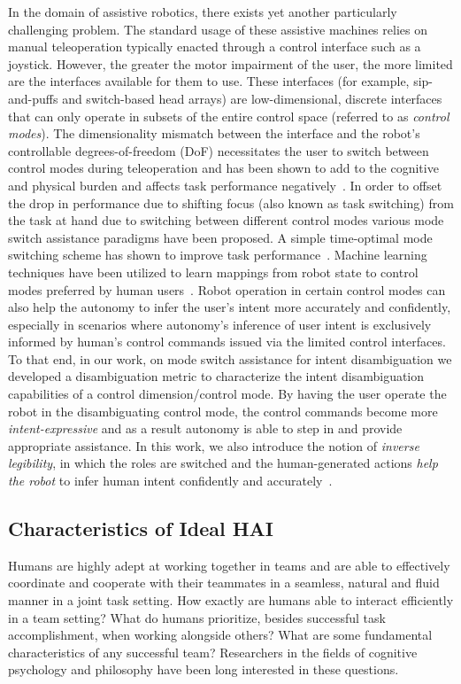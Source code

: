 \documentclass[12pt]{article}
\begin{document}
In the domain of assistive robotics, there exists yet another particularly challenging problem. The standard usage of these assistive machines relies on manual teleoperation typically enacted through a control interface such as a joystick. However, the greater the motor impairment of the user, the more limited are the interfaces available for them to use. These interfaces (for example, sip-and-puffs and switch-based head arrays) are low-dimensional, discrete interfaces that can only operate in subsets of the entire control space (referred to as \textit{control modes}). The dimensionality mismatch between the interface and the robot's controllable degrees-of-freedom (DoF) necessitates the user to switch between control modes during teleoperation and has been shown to add to the cognitive and physical burden and affects task performance negatively~\cite{pilarski2012dynamic}.
In order to offset the drop in performance due to shifting focus (also known as task switching) from the task at hand due to switching between different control modes various mode switch assistance paradigms have been proposed. A simple time-optimal mode switching scheme has shown to improve task performance~\cite{herlant2016assistive}. Machine learning techniques have been utilized to learn mappings from robot state to control modes preferred by human users~\cite{jainrobot}. Robot operation in certain control modes can also help the autonomy to infer the user's intent more accurately and confidently, especially in scenarios where autonomy's inference of user intent is exclusively informed by human's control commands issued via the limited control interfaces. To that end, in our work, on mode switch assistance for intent disambiguation we developed a disambiguation metric to characterize the intent disambiguation capabilities of a control dimension/control mode. By having the user operate the robot in the disambiguating control mode, the control commands become more \textit{intent-expressive} and as a result autonomy is able to step in and provide appropriate assistance. In this work, we also introduce the notion of \textit{inverse legibility}, in which the roles are switched and the human-generated actions \textit{help the robot} to infer human intent confidently and accurately~\cite{gopinath2017mode}. 

\subsection{Characteristics of Ideal HAI}
Humans are highly adept at working together in teams and are able to effectively coordinate and cooperate with their teammates in a seamless, natural and fluid manner in a joint task setting. How exactly are humans able to interact efficiently in a team setting?  What do humans prioritize, besides successful task accomplishment, when working alongside others? What are some fundamental characteristics of any successful team? Researchers in the fields of cognitive psychology and  philosophy have been long interested in these questions. 
\end{document}
